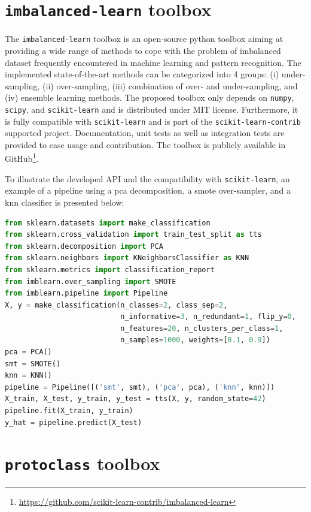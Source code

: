 \section{\texttt{imbalanced-learn} toolbox}\label{chp4:sec:imblearn}

The \texttt{imbalanced-learn} toolbox is an open-source python toolbox aiming at providing a wide range of methods to cope with the problem of imbalanced dataset frequently encountered in machine learning and pattern recognition.
The implemented state-of-the-art methods can be categorized into 4 groups: (i) under-sampling, (ii) over-sampling, (iii) combination of over- and under-sampling, and (iv) ensemble learning methods.
The proposed toolbox only depends on \texttt{numpy}, \texttt{scipy}, and \texttt{scikit-learn} and is distributed under MIT license.
Furthermore, it is fully compatible with \texttt{scikit-learn} and is part of the \texttt{scikit-learn-contrib} supported project.
Documentation, unit tests as well as integration tests are provided to ease usage and contribution.
The toolbox is publicly available in GitHub\footnote{\url{https://github.com/scikit-learn-contrib/imbalanced-learn}}.

To illustrate the developed API and the compatibility with \texttt{scikit-learn}, an example of a pipeline using a \ac{pca} decomposition, a \ac{smote} over-sampler, and a \ac{knn} classifier is presented below:

\begin{lstlisting}[language=Python, caption=Code snippet to over-sample a dataset using \acs*{smote} in conjunction with \ac{pca} and a \ac{knn} classifer.]
from sklearn.datasets import make_classification
from sklearn.cross_validation import train_test_split as tts
from sklearn.decomposition import PCA
from sklearn.neighbors import KNeighborsClassifier as KNN
from sklearn.metrics import classification_report
from imblearn.over_sampling import SMOTE
from imblearn.pipeline import Pipeline
X, y = make_classification(n_classes=2, class_sep=2,
                           n_informative=3, n_redundant=1, flip_y=0,
                           n_features=20, n_clusters_per_class=1,
                           n_samples=1000, weights=[0.1, 0.9])
pca = PCA()
smt = SMOTE()
knn = KNN()
pipeline = Pipeline([('smt', smt), ('pca', pca), ('knn', knn)])
X_train, X_test, y_train, y_test = tts(X, y, random_state=42)
pipeline.fit(X_train, y_train)
y_hat = pipeline.predict(X_test)
\end{lstlisting}

\section{\texttt{protoclass} toolbox}\label{chp4:sec:protoclass}

